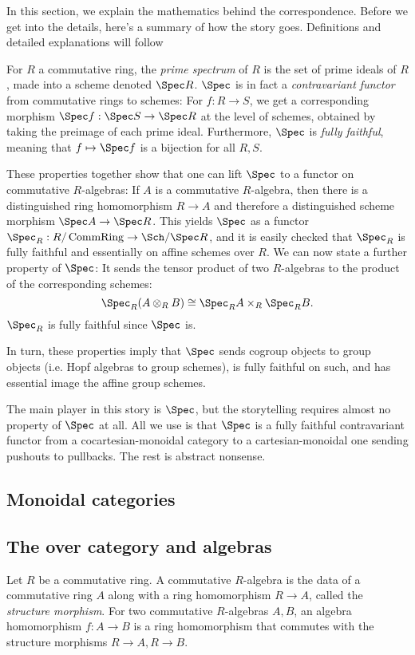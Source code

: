 \documentclass{article}
\DeclareMathOperator{\CommRing}{CommRing}
\begin{document}
In this section, we explain the mathematics behind the correspondence.
Before we get into the details, here's a summary of how the story goes.
Definitions and detailed explanations will follow

For $R$ a commutative ring, the \emph{prime spectrum} of $R$ is the set of prime ideals of $R$,
made into a scheme denoted $\Spec R$.
$\Spec$ is in fact a \emph{contravariant functor} from commutative rings to schemes:
For $f : R \to S$, we get a corresponding morphism $\Spec f : \Spec S \to \Spec R$
at the level of schemes, obtained by taking the preimage of each prime ideal.
Furthermore, $\Spec$ is \emph{fully faithful},
meaning that $f \mapsto \Spec f$ is a bijection for all $R, S$.

These properties together show that one can lift $\Spec$ to a functor on commutative $R$-algebras:
If $A$ is a commutative $R$-algebra, then there is a distinguished ring homomorphism $R \to A$
and therefore a distinguished scheme morphism $\Spec A \to \Spec R$.
This yields $\Spec$ as a functor $\Spec_R : R / \CommRing \to \Sch / \Spec R$,
and it is easily checked that $\Spec_R$ is fully faithful and essentially on affine schemes over $R$.
We can now state a further property of $\Spec$:
It sends the tensor product of two $R$-algebras to the product of the corresponding schemes:
\[
\Spec_R (A \otimes_R B) \cong \Spec_R A \times_R \Spec_R B.
\]
$\Spec_R$ is fully faithful since $\Spec$ is.

In turn, these properties imply that $\Spec$ sends cogroup objects to group objects
(i.e. Hopf algebras to group schemes), is fully faithful on such,
and has essential image the affine group schemes.

The main player in this story is $\Spec$,
but the storytelling requires almost no property of $\Spec$ at all.
All we use is that $\Spec$ is a fully faithful contravariant functor
from a cocartesian-monoidal category to a cartesian-monoidal one sending pushouts to pullbacks.
The rest is abstract nonsense.


\subsection{Monoidal categories}


\subsection{The over category and algebras}


Let $R$ be a commutative ring.
A commutative $R$-algebra is the data of a commutative ring $A$ along with a ring homomorphism
$R \to A$, called the \emph{structure morphism}.
For two commutative $R$-algebras $A, B$,
an algebra homomorphism $f : A \to B$ is a ring homomorphism that commutes
with the structure morphisms $R \to A, R \to B$.
\end{document}
